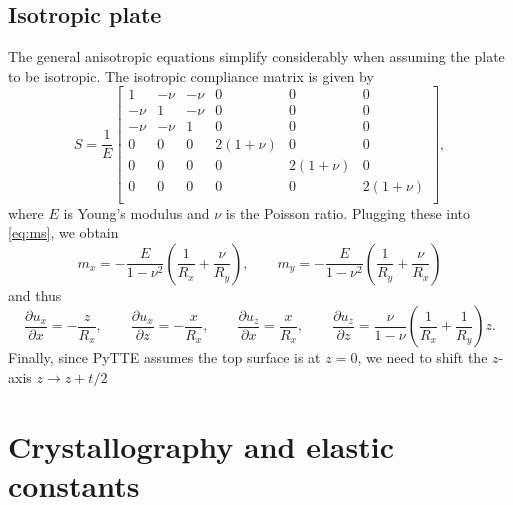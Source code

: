 \documentclass[11pt,a4paper]{article}
\begin{document}
\subsection{Isotropic plate}
The general anisotropic equations simplify considerably when assuming the plate to be isotropic. The isotropic compliance matrix is given by
\begin{equation}
S = \frac{1}{E}\left[\begin{matrix}
1 & -\nu & -\nu & 0 & 0 & 0 \\
-\nu & 1 & -\nu & 0 & 0 & 0 \\
-\nu & -\nu & 1 & 0 & 0 & 0 \\
0 & 0 & 0 & 2(1+\nu) & 0 & 0 \\
0 & 0 & 0 & 0 &2(1+\nu)  & 0 \\
0 & 0 & 0 & 0 & 0 & 2(1+\nu) \\
\end{matrix}\right],
\end{equation}
where $E$ is Young's modulus and $\nu$ is the Poisson ratio.
Plugging these into \eqref{eq:ms}, we obtain
\begin{equation}
m_x = -\frac{E}{1-\nu^2}\left(\frac{1}{R_x}+\frac{\nu}{R_y} \right), \qquad
m_y = -\frac{E}{1-\nu^2}\left(\frac{1}{R_y}+\frac{\nu}{R_x} \right)
\end{equation}
and thus 
\begin{equation}
\frac{\partial u_x}{\partial x} = -\frac{z}{R_x}, \qquad
\frac{\partial u_x}{\partial z} = -\frac{x}{R_x}, \qquad
\frac{\partial u_z}{\partial x} = \frac{x}{R_x}, \qquad
\frac{\partial u_z}{\partial z} = \frac{\nu}{1-\nu}\left(\frac{1}{R_x}+\frac{1}{R_y}\right)z.
\end{equation}
Finally, since PyTTE assumes the top surface is at $z=0$, we need to shift the $z$-axis $z \rightarrow z + t/2 $
\section{Crystallography and elastic constants}
\end{document}
